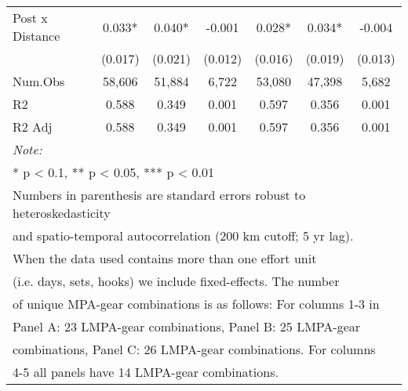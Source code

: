\begin{table}
\begin{tabular}[t]{lcccccc}
\addlinespace[0.5cm]
\multicolumn{7}{l}{Panel C: 0-600 nautical miles}\\
\hline
\hspace{1em}Post x Distance & 0.033* & 0.040* & -0.001 & 0.028* & 0.034* & -0.004\\
\hspace{1em} & (0.017) & (0.021) & (0.012) & (0.016) & (0.019) & (0.013)\\
\hspace{1em}Num.Obs & 58,606 & 51,884 & 6,722 & 53,080 & 47,398 & 5,682\\
\hspace{1em}R2 & 0.588 & 0.349 & 0.001 & 0.597 & 0.356 & 0.001\\
\hspace{1em}R2 Adj & 0.588 & 0.349 & 0.001 & 0.597 & 0.356 & 0.001\\
\bottomrule
\multicolumn{7}{l}{\rule{0pt}{1em}\textit{Note: }}\\
\multicolumn{7}{l}{\rule{0pt}{1em}* p < 0.1, ** p < 0.05, *** p < 0.01}\\
\multicolumn{7}{l}{\rule{0pt}{1em}Numbers in parenthesis are standard errors robust to heteroskedasticity}\\
\multicolumn{7}{l}{\rule{0pt}{1em}and spatio-temporal autocorrelation (200 km cutoff; 5 yr lag).}\\
\multicolumn{7}{l}{\rule{0pt}{1em}When the data used contains more than one effort unit}\\
\multicolumn{7}{l}{\rule{0pt}{1em}(i.e. days, sets, hooks) we include fixed-effects. The number}\\
\multicolumn{7}{l}{\rule{0pt}{1em}of unique MPA-gear combinations is as follows: For columns 1-3 in}\\
\multicolumn{7}{l}{\rule{0pt}{1em}Panel A: 23 LMPA-gear combinations, Panel B: 25 LMPA-gear}\\
\multicolumn{7}{l}{\rule{0pt}{1em}combinations, Panel C: 26 LMPA-gear combinations. For columns}\\
\multicolumn{7}{l}{\rule{0pt}{1em}4-5 all panels have 14 LMPA-gear combinations.}\\
\end{tabular}
\end{table}